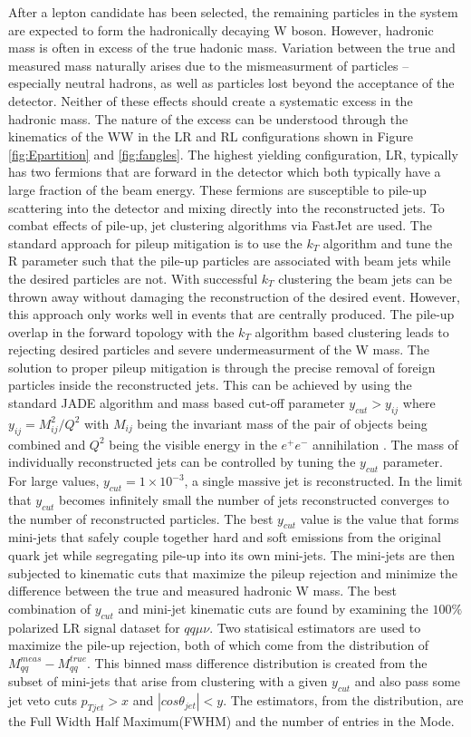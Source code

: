 After a lepton candidate has been selected, the remaining particles in the system are expected to form the hadronically decaying W boson. However, hadronic mass is often in excess of the true hadonic mass. Variation between the true and measured mass naturally arises due to the mismeasurment of particles -- especially neutral hadrons, as well as particles lost beyond the acceptance of the detector. Neither of these effects should create a systematic excess in the hadronic mass. The nature of the excess can be understood through the kinematics of the WW in the LR and RL configurations shown in Figure \ref{fig:Epartition} and \ref{fig:fangles}. The highest yielding configuration, LR, typically has two fermions that are forward in the detector which both typically have a large fraction of the beam energy. These fermions are susceptible to pile-up scattering into the detector and mixing directly into the reconstructed jets. To combat effects of pile-up, jet clustering algorithms via FastJet\cite{fastjet} are used.  The standard approach for pileup mitigation is to use the $k_T$ algorithm\cite{kt} and tune the R parameter such that the pile-up particles are associated with beam jets while the desired particles are not. With successful $k_T$ clustering the beam jets can be thrown away without damaging the reconstruction of the desired event. However, this approach only works well in events that are centrally produced.  The pile-up overlap in the forward topology with the $k_T$ algorithm  based clustering leads to rejecting desired particles and severe undermeasurment of the W mass. The solution to proper pileup mitigation is through the precise removal of foreign particles inside the reconstructed jets.  This can be achieved by using the standard JADE algorithm and mass based cut-off parameter $y_{cut} > y_{ij}$ where $y_{ij} = M_{ij}^2 / Q^2$ with $M_{ij}$ being the invariant mass of the pair of objects being combined and $Q^2$ being the visible energy in the $e^{+}e^{-}$ annihilation \cite{ycut}.  The mass of individually reconstructed jets can be controlled by tuning the $y_{cut}$ parameter. For large values, $y_{cut} =1\times10^{-3}$, a single massive jet is reconstructed. In the limit that $y_{cut}$ becomes infinitely small the number of jets reconstructed converges to the number of reconstructed particles.  The best $y_{cut}$ value is the value that forms mini-jets that safely couple together hard and soft emissions from  the original quark jet while segregating pile-up into its own mini-jets. The mini-jets are then subjected to kinematic cuts that maximize the pileup rejection and minimize the difference  between the true and measured hadronic W mass. 	The best combination of $y_{cut}$ and mini-jet kinematic cuts are found by examining the $100\%$ polarized LR signal dataset for $qq \mu \nu$.  Two statisical estimators are used to maximize the pile-up rejection, both of which come from the distribution of $M_{qq}^{meas} - M_{qq}^{true}$. This binned mass difference distribution is created from the subset of mini-jets that arise from clustering with a given $y_{cut}$ and also pass some jet veto cuts $p_{Tjet} > x$ and $|cos\theta_{jet}| < y$. The estimators, from the distribution, are the Full Width Half Maximum(FWHM) and the number of entries in the Mode.  
